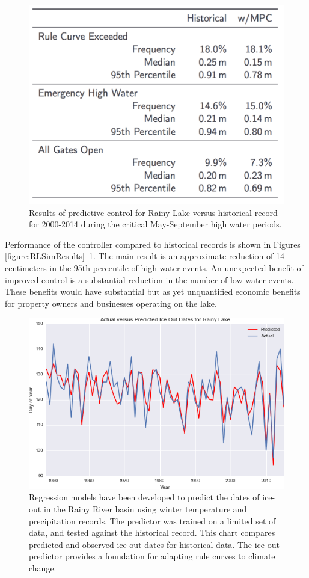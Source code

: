 \documentclass[preprint,times]{elsarticle}
\begin{document}
\begin{figure}
\includegraphics[width=\linewidth]{RLSimResultsB}
\caption{Results of predictive control for Rainy Lake versus historical record for 2000-2014 during the critical May-September high water periods.}\label{figure:RLSimResultsB}
\end{figure}

Performance of the controller compared to historical records is shown in Figures \ref{figure:RLSimResults}--\ref{figure:RLSimResultsB}. The main result is an approximate reduction of 14 centimeters in the 95th percentile of high water events. An unexpected benefit of improved control is a substantial reduction in the number of low water events. These benefits would have substantial but as yet unquantified economic benefits for property owners and businesses operating on the lake.

\begin{figure}
\includegraphics[width=\linewidth]{figures/IceOutPredictor}
\caption{Regression models have been developed to predict the dates of ice-out in the Rainy River basin using winter temperature and precipitation records. The predictor was trained on a limited set of data, and tested against the historical record. This chart compares predicted and observed ice-out dates for historical data.  The ice-out predictor provides a foundation for adapting rule curves to climate change.}\label{figure:11}
\end{figure}
\end{document}
